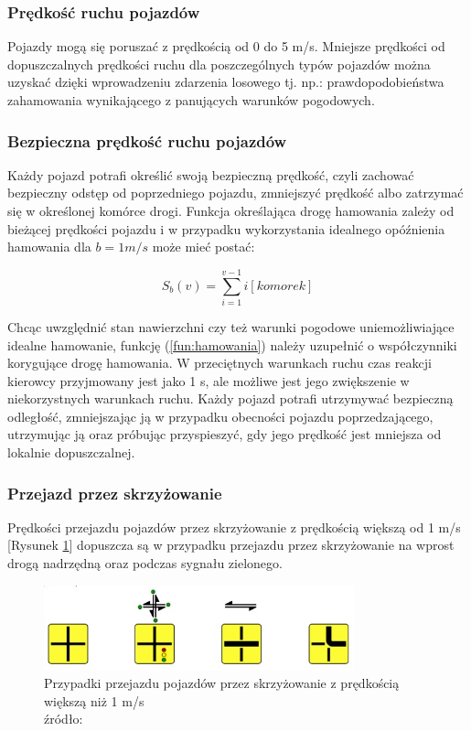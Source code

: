 \documentclass{sprawozdanie-agh}
\begin{document}
	\subsubsection{Prędkość ruchu pojazdów}

	Pojazdy mogą się poruszać z prędkością od 0 do 5 m/s. Mniejsze prędkości od dopuszczalnych prędkości ruchu dla poszczególnych typów pojazdów można uzyskać dzięki wprowadzeniu zdarzenia losowego tj. np.: prawdopodobieństwa zahamowania wynikającego z panujących warunków pogodowych.

	\subsubsection{Bezpieczna prędkość ruchu pojazdów}

	Każdy pojazd potrafi określić swoją bezpieczną prędkość, czyli zachować bezpieczny odstęp od poprzedniego pojazdu, zmniejszyć prędkość albo zatrzymać się w określonej komórce drogi. Funkcja określająca drogę hamowania zależy od bieżącej prędkości pojazdu i w przypadku wykorzystania idealnego opóźnienia hamowania dla $b=1 m/s$ może mieć postać:

	\begin{equation}
		\label{fun:hamowania}
		S_{b}(v)= \sum _{i=1}^{v-1} i[komorek]
	\end{equation}

	Chcąc uwzględnić stan nawierzchni czy też warunki pogodowe uniemożliwiające idealne hamowanie, funkcję (\ref{fun:hamowania}) należy uzupełnić o współczynniki korygujące drogę hamowania.
	W przeciętnych warunkach ruchu czas reakcji kierowcy przyjmowany jest jako 1 s, ale możliwe jest jego zwiększenie w niekorzystnych warunkach ruchu.
	Każdy pojazd potrafi utrzymywać bezpieczną odległość, zmniejszając ją w przypadku obecności pojazdu poprzedzającego, utrzymując ją oraz próbując przyspieszyć, gdy jego prędkość jest mniejsza od lokalnie dopuszczalnej.

	\subsubsection{Przejazd przez skrzyżowanie}

	Prędkości przejazdu pojazdów przez skrzyżowanie z prędkością większą od 1 m/s [Rysunek \ref{fig:S1}] dopuszcza są w przypadku przejazdu przez skrzyżowanie na wprost drogą nadrzędną oraz podczas sygnału zielonego.

	\begin{figure}[H]
		\centering
		\captionsetup{justification=centering}
		\includegraphics[width=0.8\textwidth]{S1.jpg}
		\caption{Przypadki przejazdu pojazdów przez skrzyżowanie z prędkością większą niż 1 m/s \\ źródło: \cite{artykulyNaPlycie}}
		\label{fig:S1}
	\end{figure}
\end{document}
